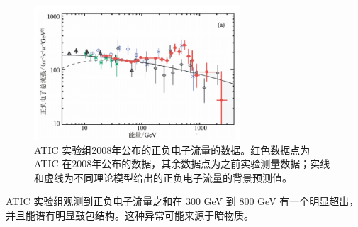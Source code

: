 \begin{figure}[!htbp]
    \centering    
    \includegraphics[height=5cm]{Img/4-3.png}
    \caption{ATIC 实验组2008年公布的正负电子流量的数据。红色数据点为 ATIC 在2008年公布的数据，其余数据点为之前实验测量数据；实线和虚线为不同理论模型给出的正负电子流量的背景预测值。 }
    \label{4-3}
\end{figure}

ATIC 实验组观测到正负电子流量之和在 300 GeV 到 800 GeV 有一个明显超出，并且能谱有明显鼓包结构。这种异常可能来源于暗物质。

\newpage